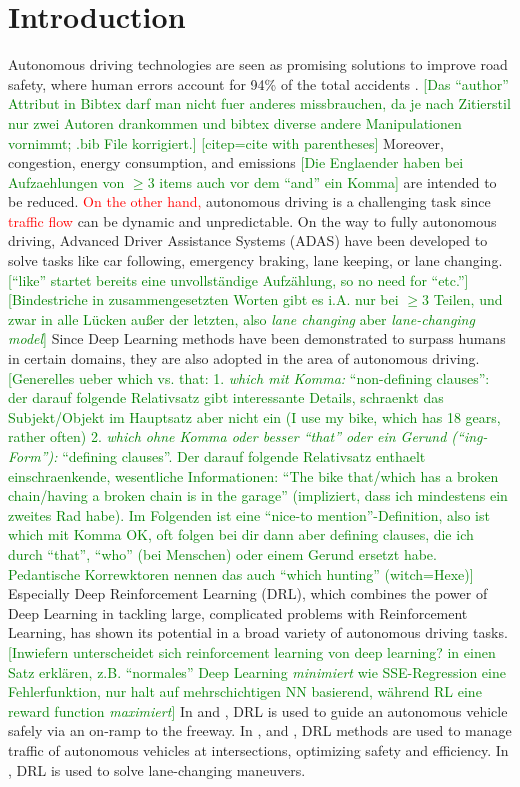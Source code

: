 \documentclass[review]{elsarticle}
\providecommand{\red}[1]{\textcolor{red}{#1}}
\providecommand{\green}[1]{\textcolor{green}{#1}}
\providecommand{\martin}[1]{\red{#1}} %
\providecommand{\martinc}[1]{\green{[#1]}} %
\providecommand{\3}{{\ss}}
\begin{document}
\section{Introduction}
Autonomous driving technologies are seen as promising solutions to
improve road safety, where human errors account for 94\% of the total
accidents \citep{vehicleCrashSurvey2015}.  
\martinc{Das ``author'' Attribut in Bibtex darf man nicht
  fuer anderes missbrauchen, da je nach Zitierstil nur zwei Autoren
  drankommen und bibtex diverse andere Manipulationen vornimmt; .bib
  File korrigiert.}
  \martinc{citep=cite with parentheses}
Moreover, congestion, energy
consumption, and emissions \martinc{Die Englaender haben bei
  Aufzaehlungen von $\ge 3$ items auch vor dem ``and'' ein Komma} are intended to be reduced. 
\martin{On the other hand,} autonomous driving is a challenging task
since \martin{traffic flow} can be dynamic and unpredictable.
On the way to fully autonomous driving, Advanced Driver Assistance Systems
(ADAS) have been developed to solve tasks like car following, emergency
braking, lane keeping, or lane changing. \martinc{``like'' startet
  bereits eine unvollst\"andige Aufz\"ahlung, so no need for ``etc.''}
\martinc{Bindestriche in zusammengesetzten Worten gibt es i.A. nur bei 
  $\ge 3$ Teilen, und zwar in alle L\"ucken au\3er der letzten, also
  \emph{lane changing} aber \emph{lane-changing model}}
Since Deep Learning methods have been demonstrated to surpass humans
in certain domains, they are also adopted in the area of autonomous
driving.
\martinc{Generelles ueber which vs. that: 
1. \emph{which mit Komma:}
  ``non-defining clauses'': der darauf folgende Relativsatz gibt interessante Details,
  schraenkt das Subjekt/Objekt im Hauptsatz aber nicht ein (I use my bike, which has 18
  gears, rather often)
2. \emph{which ohne Komma oder besser ``that'' oder ein Gerund (``ing-Form''):} ``defining clauses''. Der darauf folgende Relativsatz enthaelt einschraenkende,
wesentliche Informationen: ``The bike that/which has a
broken chain/having a broken chain is in the garage'' (impliziert,
dass ich mindestens ein zweites Rad habe). Im Folgenden ist eine ``nice-to
mention''-Definition, also ist which mit Komma OK, oft folgen bei dir dann
aber defining clauses, die ich durch ``that'', ``who'' (bei Menschen)
oder einem Gerund ersetzt habe. Pedantische Korrewktoren nennen das
auch ``which hunting'' (witch=Hexe)}
Especially Deep Reinforcement Learning (DRL), which combines the power
of Deep Learning in tackling large, complicated problems with
Reinforcement Learning, has shown its potential in a broad variety of
autonomous driving tasks.\martinc{Inwiefern unterscheidet sich
  reinforcement learning von deep learning? in einen Satz erkl\"aren,
  z.B. ``normales'' Deep Learning \emph{minimiert} wie SSE-Regression
  eine Fehlerfunktion, nur halt auf mehrschichtigen NN basierend, w\"ahrend RL eine reward function \emph{maximiert}}  
In \cite{OnRampMerge2018} and \cite{OnRampMerge2020}, DRL is used to
guide an autonomous vehicle safely via an on-ramp to the freeway. In \cite{intersection1}, \cite{intersection3} and \cite{intersection2}, DRL methods are used to manage traffic of autonomous vehicles at intersections, optimizing safety and efficiency.
In \cite{LangeChange1}, DRL is used to solve lane-changing maneuvers.
\end{document}
